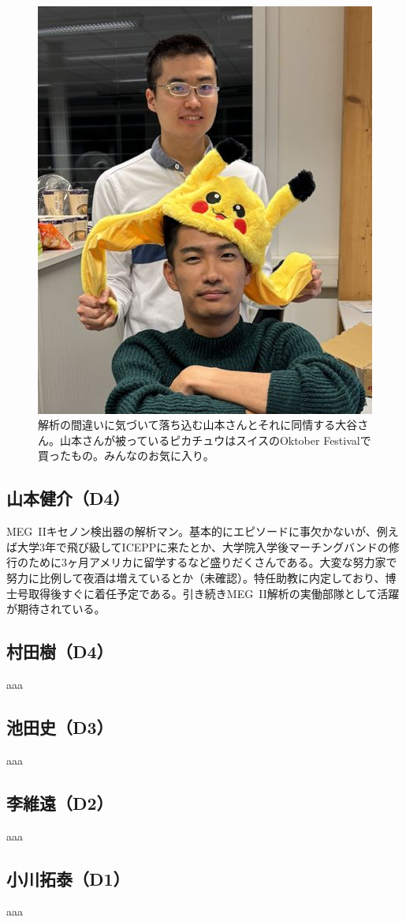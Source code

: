 \begin{figure}
  \vspace*{-\intextsep}
  \centering
  \includegraphics[width=0.3\columnwidth]{fig/atsushi_kensuke.png}
  \caption{解析の間違いに気づいて落ち込む山本さんとそれに同情する大谷さん。山本さんが被っているピカチュウはスイスのOktober Festivalで買ったもの。みんなのお気に入り。}
  \label{fig:atsushi_kensuke}
\end{figure}

\subsection{山本健介（D4）}

MEG~IIキセノン検出器の解析マン。基本的にエピソードに事欠かないが、例えば大学3年で飛び級してICEPPに来たとか、大学院入学後マーチングバンドの修行のために3ヶ月アメリカに留学するなど盛りだくさんである。大変な努力家で努力に比例して夜酒は増えているとか（未確認）。特任助教に内定しており、博士号取得後すぐに着任予定である。引き続きMEG~II解析の実働部隊として活躍が期待されている。%


\subsection{村田樹（D4）}
aaa

\subsection{池田史（D3）}
aaa

\subsection{李維遠（D2）}
\label{subsec:weiyuan}
aaa

\subsection{小川拓泰（D1）}
aaa

